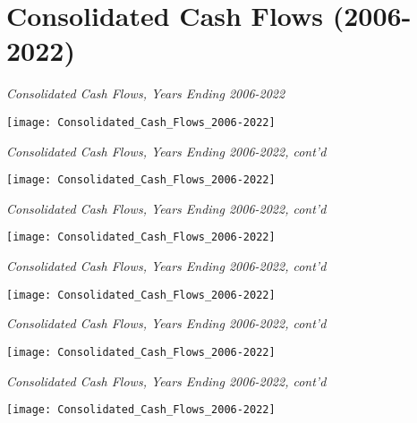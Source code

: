 
\chapter{Consolidated Cash Flows (2006-2022)}
\label{ch:consolidated_activities_2010-22}

\begin{sidewaystable}
  \caption[Consolidated Cash Flows, Years Ending 2006–2022]{\textit{Consolidated Cash Flows, Years Ending 2006-2022}}%
  \label{tab:consolidated_cash_flows} %
  \texttt{[image: Consolidated\_Cash\_Flows\_2006-2022]} %
\end{sidewaystable}

\begin{sidewaystable}
  \caption*{\textit{Consolidated Cash Flows, Years Ending 2006-2022, cont'd}}
  \texttt{[image: Consolidated\_Cash\_Flows\_2006-2022]} %
\end{sidewaystable}

\begin{sidewaystable}
  \caption*{\textit{Consolidated Cash Flows, Years Ending 2006-2022, cont'd}}
  \texttt{[image: Consolidated\_Cash\_Flows\_2006-2022]} %
\end{sidewaystable}

\begin{sidewaystable}

  \caption*{\textit{Consolidated Cash Flows, Years Ending 2006-2022, cont'd}}
  \texttt{[image: Consolidated\_Cash\_Flows\_2006-2022]} %
\end{sidewaystable}

\begin{sidewaystable}

  \caption*{\textit{Consolidated Cash Flows, Years Ending 2006-2022, cont'd}}
  \texttt{[image: Consolidated\_Cash\_Flows\_2006-2022]} %
\end{sidewaystable}

\begin{sidewaystable}

  \caption*{\textit{Consolidated Cash Flows, Years Ending 2006-2022, cont'd}}
  \texttt{[image: Consolidated\_Cash\_Flows\_2006-2022]} %
\end{sidewaystable}

